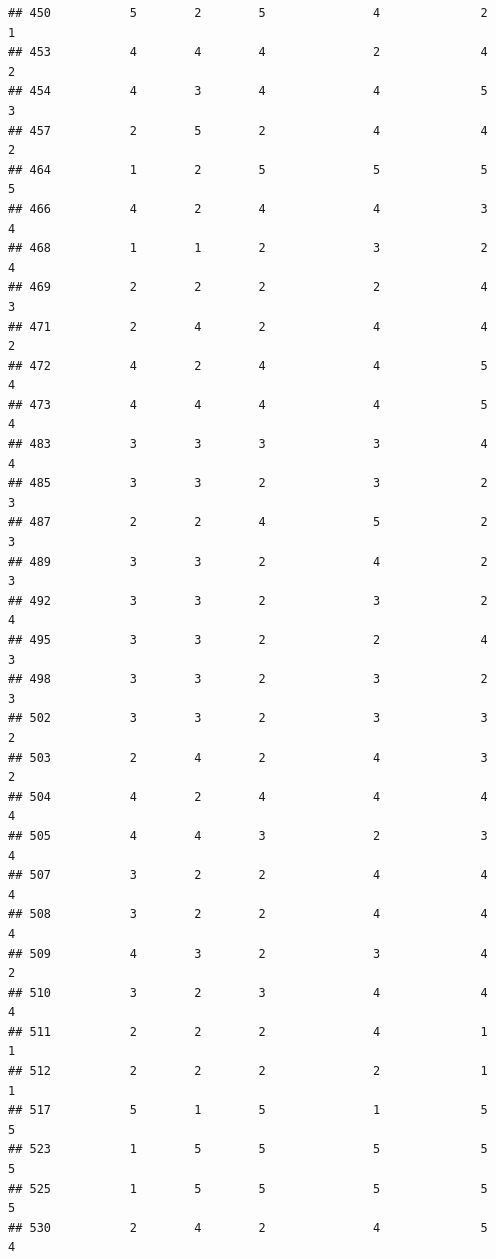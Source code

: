 \documentclass[
]{article}
\begin{document}
\begin{verbatim}
## 450           5        2        5               4              2             1
## 453           4        4        4               2              4             2
## 454           4        3        4               4              5             3
## 457           2        5        2               4              4             2
## 464           1        2        5               5              5             5
## 466           4        2        4               4              3             4
## 468           1        1        2               3              2             4
## 469           2        2        2               2              4             3
## 471           2        4        2               4              4             2
## 472           4        2        4               4              5             4
## 473           4        4        4               4              5             4
## 483           3        3        3               3              4             4
## 485           3        3        2               3              2             3
## 487           2        2        4               5              2             3
## 489           3        3        2               4              2             3
## 492           3        3        2               3              2             4
## 495           3        3        2               2              4             3
## 498           3        3        2               3              2             3
## 502           3        3        2               3              3             2
## 503           2        4        2               4              3             2
## 504           4        2        4               4              4             4
## 505           4        4        3               2              3             4
## 507           3        2        2               4              4             4
## 508           3        2        2               4              4             4
## 509           4        3        2               3              4             2
## 510           3        2        3               4              4             4
## 511           2        2        2               4              1             1
## 512           2        2        2               2              1             1
## 517           5        1        5               1              5             5
## 523           1        5        5               5              5             5
## 525           1        5        5               5              5             5
## 530           2        4        2               4              5             4

\end{verbatim}
\end{document}
